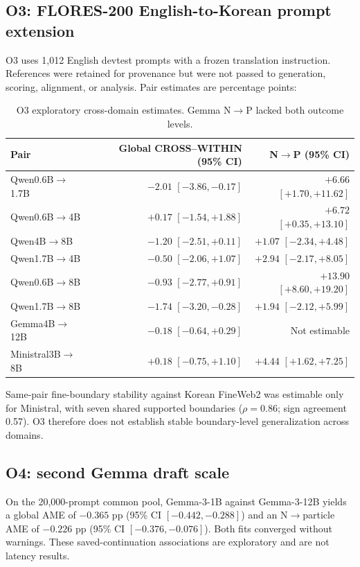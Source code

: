 \documentclass[11pt]{article}
\begin{document}
\subsection{O3: FLORES-200 English-to-Korean prompt extension}

O3 uses 1,012 English devtest prompts with a frozen translation instruction.
References were retained for provenance but were not passed to generation,
scoring, alignment, or analysis. Pair estimates are percentage points:

\begin{table}[t]
\centering
\scriptsize
\begin{tabular}{lrr}
\toprule
Pair & Global CROSS--WITHIN (95\% CI) & N$\rightarrow$P (95\% CI) \\
\midrule
Qwen0.6B$\rightarrow$1.7B & $-2.01$ $[-3.86,-0.17]$ & $+6.66$ $[+1.70,+11.62]$ \\
Qwen0.6B$\rightarrow$4B & $+0.17$ $[-1.54,+1.88]$ & $+6.72$ $[+0.35,+13.10]$ \\
Qwen4B$\rightarrow$8B & $-1.20$ $[-2.51,+0.11]$ & $+1.07$ $[-2.34,+4.48]$ \\
Qwen1.7B$\rightarrow$4B & $-0.50$ $[-2.06,+1.07]$ & $+2.94$ $[-2.17,+8.05]$ \\
Qwen0.6B$\rightarrow$8B & $-0.93$ $[-2.77,+0.91]$ & $+13.90$ $[+8.60,+19.20]$ \\
Qwen1.7B$\rightarrow$8B & $-1.74$ $[-3.20,-0.28]$ & $+1.94$ $[-2.12,+5.99]$ \\
Gemma4B$\rightarrow$12B & $-0.18$ $[-0.64,+0.29]$ & Not estimable \\
Ministral3B$\rightarrow$8B & $+0.18$ $[-0.75,+1.10]$ & $+4.44$ $[+1.62,+7.25]$ \\
\bottomrule
\end{tabular}
\caption{O3 exploratory cross-domain estimates. Gemma N$\rightarrow$P
lacked both outcome levels.}
\label{tab:o3}
\end{table}

Same-pair fine-boundary stability against Korean FineWeb2 was estimable only
for Ministral, with seven shared supported boundaries ($\rho=0.86$; sign
agreement 0.57). O3 therefore does not establish stable boundary-level
generalization across domains.

\subsection{O4: second Gemma draft scale}

On the 20,000-prompt common pool, Gemma-3-1B against Gemma-3-12B yields a
global AME of $-0.365$ pp (95\% CI $[-0.442,-0.288]$) and an
N$\rightarrow$particle AME of $-0.226$ pp (95\% CI $[-0.376,-0.076]$).
Both fits converged without warnings. These saved-continuation associations
are exploratory and are not latency results.
\end{document}
